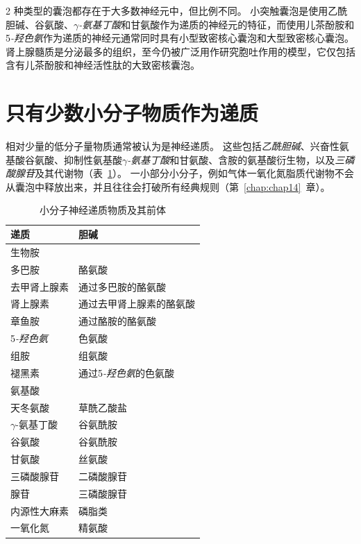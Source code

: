 2 种类型的囊泡都存在于大多数神经元中，但比例不同。
小突触囊泡是使用乙酰胆碱、谷氨酸、\textit{$\gamma$-氨基丁酸}和甘氨酸作为递质的神经元的特征，而使用儿茶酚胺和5\textit{-羟色氨}作为递质的神经元通常同时具有小型致密核心囊泡和大型致密核心囊泡。
肾上腺髓质是分泌最多的组织，至今仍被广泛用作研究胞吐作用的模型，它仅包括含有儿茶酚胺和神经活性肽的大致密核囊泡。



\section{只有少数小分子物质作为递质}

相对少量的低分子量物质通常被认为是神经递质。
这些包括\textit{乙酰胆碱}、兴奋性氨基酸谷氨酸、抑制性氨基酸\textit{$\gamma$-氨基丁酸}和甘氨酸、含胺的氨基酸衍生物，以及\textit{三磷酸腺苷}及其代谢物（表~\ref{tab:16_1}）。
一小部分小分子，例如气体一氧化氮脂质代谢物不会从囊泡中释放出来，并且往往会打破所有经典规则（第~\ref{chap:chap14}~章）。


\begin{table}[htbp]
	\caption{小分子神经递质物质及其前体} \label{tab:16_1} \centering
	\begin{tabular}{ll}
		\toprule
		递质 & 胆碱 \\
		\midrule
		生物胺 &   \\
		多巴胺 & 酪氨酸 \\
		去甲肾上腺素 & 通过多巴胺的酪氨酸 \\
		肾上腺素 & 通过去甲肾上腺素的酪氨酸 \\
		章鱼胺 & 通过酪胺的酪氨酸 \\
		5\textit{-羟色氨} & 色氨酸 \\
		组胺 & 组氨酸 \\
		褪黑素 & 通过5\textit{-羟色氨}的色氨酸 \\
		氨基酸 &  \\
		天冬氨酸 & 草酰乙酸盐 \\
		$\gamma$-氨基丁酸 & 谷氨酰胺 \\
		谷氨酸 & 谷氨酰胺 \\
		甘氨酸 & 丝氨酸 \\
		三磷酸腺苷 & 二磷酸腺苷 \\
		腺苷 & 三磷酸腺苷 \\
		内源性大麻素 & 磷脂类 \\
		一氧化氮 & 精氨酸 \\
		\bottomrule
	\end{tabular}
\end{table}


